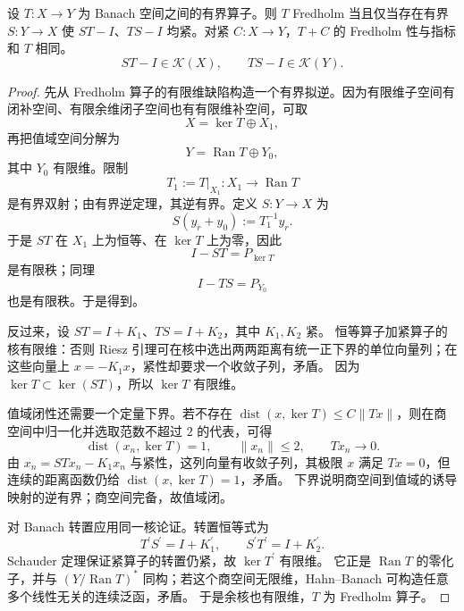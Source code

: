 \begin{theorem}\label{thm:math-fredholm-atkinson}
设 $T:X\to Y$ 为 Banach 空间之间的有界算子。则 $T$ Fredholm 当且仅当存在有界 $S:Y\to X$ 使 $ST-I$、$TS-I$ 均紧。对紧 $C:X\to Y$，$T+C$ 的 Fredholm 性与指标和 $T$ 相同。
\begin{equation}
ST-I\in\mathcal K(X),\qquad TS-I\in\mathcal K(Y).
\label{eq:math-fredholm-parametrix-mod-compact}
\end{equation}
\end{theorem}
\begin{proof}
先从 Fredholm 算子的有限维缺陷构造一个有界拟逆。因为有限维子空间有闭补空间、有限余维闭子空间也有有限维补空间，可取
\[
X=\ker T\oplus X_1,
\]
再把值域空间分解为
\[
Y=\operatorname{Ran}T\oplus Y_0,
\]
其中 $Y_0$ 有限维。限制
\[
T_1:=T|_{X_1}:X_1\to\operatorname{Ran}T
\]
是有界双射；由有界逆定理，其逆有界。定义 $S:Y\to X$ 为
\[
S(y_r+y_0):=T_1^{-1}y_r.
\]
于是 $ST$ 在 $X_1$ 上为恒等、在 $\ker T$ 上为零，因此
\[
I-ST=P_{\ker T}
\]
是有限秩；同理
\[
I-TS=P_{Y_0}
\]
也是有限秩。于是得到。

反过来，设 $ST=I+K_1$、$TS=I+K_2$，其中 $K_1,K_2$ 紧。
恒等算子加紧算子的核有限维：否则 Riesz 引理可在核中选出两两距离有统一正下界的单位向量列；在这些向量上 $x=-K_1x$，紧性却要求一个收敛子列，矛盾。
因为 $\ker T\subset\ker(ST)$，所以 $\ker T$ 有限维。

值域闭性还需要一个定量下界。若不存在 $\operatorname{dist}(x,\ker T)\le C\|Tx\|$，则在商空间中归一化并选取范数不超过 $2$ 的代表，可得
\[
\operatorname{dist}(x_n,\ker T)=1,\qquad \|x_n\|\le2,
\qquad Tx_n\to0.
\]
由 $x_n=STx_n-K_1x_n$ 与紧性，这列向量有收敛子列，其极限 $x$ 满足 $Tx=0$，但连续的距离函数仍给 $\operatorname{dist}(x,\ker T)=1$，矛盾。
下界说明商空间到值域的诱导映射的逆有界；商空间完备，故值域闭。

对 Banach 转置应用同一核论证。转置恒等式为
\[
T^\prime S^\prime=I+K_1^\prime,\qquad
S^\prime T^\prime=I+K_2^\prime.
\]
Schauder 定理保证紧算子的转置仍紧，故 $\ker T^\prime$ 有限维。
它正是 $\operatorname{Ran}T$ 的零化子，并与 $(Y/\operatorname{Ran}T)^*$ 同构；若这个商空间无限维，Hahn--Banach 可构造任意多个线性无关的连续泛函，矛盾。
于是余核也有限维，$T$ 为 Fredholm 算子。


\end{proof}

